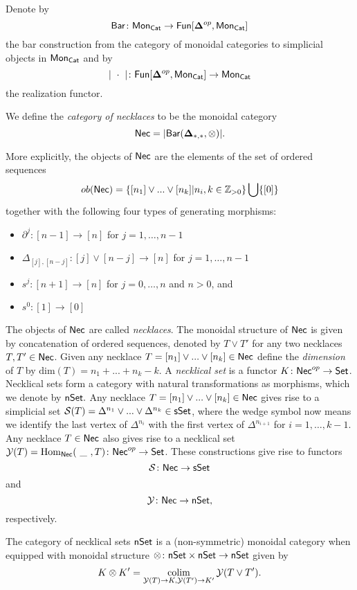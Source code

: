 Denote by $$\mathsf{Bar} \colon \mathsf{Mon}_{\mathsf{Cat}} \to \mathsf{Fun}[\mathbf{\Delta}^{op}, \mathsf{Mon}_{\mathsf{Cat}}]$$ the bar construction from the category of monoidal categories to simplicial objects in $\mathsf{Mon}_{\mathsf{Cat}}$ and by 
$$| \text{ }\cdot\text{ }  | \colon \mathsf{Fun}[\mathbf{\Delta}^{op}, \mathsf{Mon}_{\mathsf{Cat}}] \to \mathsf{Mon}_{\mathsf{Cat}}$$ the realization functor. 

We define the \textit{category of necklaces} to be the monoidal category $$\mathsf{Nec}= |\mathsf{Bar}(\mathbf{\Delta}_{*,*}, \otimes)|.$$

 More explicitly, the objects of $\mathsf{Nec}$ are the elements of the set of ordered sequences
 $$ ob(\mathsf{Nec}) = \{ [n_1] \vee ... \vee[n_k] | n_i, k \in \mathbb{Z}_{>0} \} \bigcup \{ [0] \}$$ together with the following four types of generating morphisms:
\begin{itemize}
\item $\partial^j \colon [n-1] \to  [n] $
for $j=1,\dots,n-1$
\item $\Delta_{[j],[n-j]} \colon  [j]\vee [n-j] \to [n]$ for $j=1,\dots,n-1$
\item $ s^j \colon [n+1] \to [n]$ for $j=0,\dots,n$ and $n>0$, and 
\item $s^0 \colon [1] \to [0]$
\end{itemize}

 The objects of $\mathsf{Nec}$ are called \textit{necklaces}.
 The monoidal structure of $\mathsf{Nec}$ is given by concatenation of ordered sequences, denoted by $T \vee T'$ for any two necklaces $T, T' \in \mathsf{Nec}$. Given any necklace $T=[n_1] \vee ... \vee[n_k] \in \mathsf{Nec}$ define the \textit{dimension} of $T$ by $\text{dim}(T)=n_1+ ...+n_k-k$. A \textit{necklical set} is a functor $K \colon \mathsf{Nec}^{op} \to \mathsf{Set}$. Necklical sets form a category with natural transformations as morphisms, which we denote by $\mathsf{nSet}.$ Any necklace $T=[n_1] \vee ... \vee[n_k] \in \mathsf{Nec}$ gives rise to a simplicial set $\mathcal{S}(T)= \Delta^{n_1} \vee... \vee \Delta^{n_k} \in \mathsf{sSet}$, where the wedge symbol now means we identify the last vertex of $\Delta^{n_i}$ with the first vertex of $\Delta^{n_{i+1}}$ for $i=1,\dots,k-1$. Any necklace $T \in \mathsf{Nec}$ also gives rise to a necklical set $\mathcal{Y}(T)=\mathrm{Hom}_{\mathsf{Nec}}(\text{ \_ }, T) \colon \mathsf{Nec}^{op} \to \mathsf{Set}$. These constructions give rise to functors 
$$\mathcal{S} \colon \mathsf{Nec} \to \mathsf{sSet}$$
and
$$\mathcal{Y} \colon \mathsf{Nec} \to \mathsf{nSet},$$ respectively. 

The category of necklical sets $\mathsf{nSet}$ is a (non-symmetric) monoidal category when equipped with monoidal structure $\otimes\colon \mathsf{nSet} \times \mathsf{nSet} \to \mathsf{nSet}$ given by $$K \otimes K' = \operatorname*{colim}_{\mathcal{Y}(T) \to K, \mathcal{Y}(T')\to K'} \mathcal{Y}(T \vee T').$$

